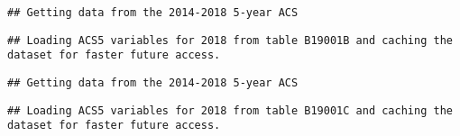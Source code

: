 \documentclass[]{article}
\newenvironment{Shaded}{\begin{snugshade}}{\end{snugshade}}
\newcommand{\DataTypeTok}[1]{\textcolor[rgb]{0.13,0.29,0.53}{#1}}
\newcommand{\DecValTok}[1]{\textcolor[rgb]{0.00,0.00,0.81}{#1}}
\newcommand{\KeywordTok}[1]{\textcolor[rgb]{0.13,0.29,0.53}{\textbf{#1}}}
\newcommand{\NormalTok}[1]{#1}
\newcommand{\OperatorTok}[1]{\textcolor[rgb]{0.81,0.36,0.00}{\textbf{#1}}}
\newcommand{\OtherTok}[1]{\textcolor[rgb]{0.56,0.35,0.01}{#1}}
\newcommand{\StringTok}[1]{\textcolor[rgb]{0.31,0.60,0.02}{#1}}
\begin{document}
\begin{verbatim}
## Getting data from the 2014-2018 5-year ACS
\end{verbatim}

\begin{verbatim}
## Loading ACS5 variables for 2018 from table B19001B and caching the dataset for faster future access.
\end{verbatim}

\begin{Shaded}
\end{Shaded}

\begin{verbatim}
## Getting data from the 2014-2018 5-year ACS
\end{verbatim}

\begin{verbatim}
## Loading ACS5 variables for 2018 from table B19001C and caching the dataset for faster future access.
\end{verbatim}

\begin{Shaded}
\end{Shaded}
\end{document}
